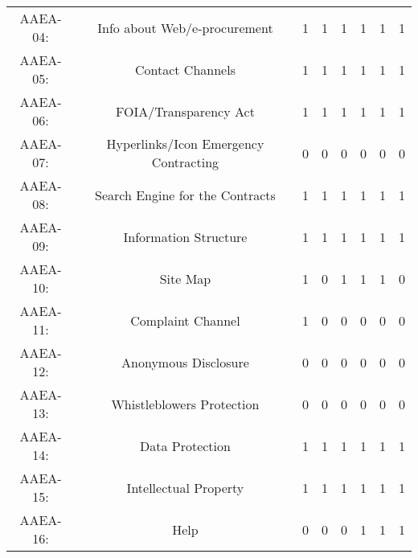 \documentclass[a4paper, twoside]{report}
\begin{document}
\begin{table}[htbp]
\begin{adjustbox}{max width=\linewidth}
\begin{tabular}{rccccccc}
    \multicolumn{1}{c}{AAEA-04:} & \multicolumn{1}{p{19em}}{Info about Web/e-procurement} & 1     & 1     & 1     & 1     & 1     & 1 \\
    \multicolumn{1}{c}{AAEA-05:} & \multicolumn{1}{p{19em}}{Contact Channels} & 1     & 1     & 1     & 1     & 1     & 1 \\
    \multicolumn{1}{c}{AAEA-06:} & \multicolumn{1}{p{19em}}{FOIA/Transparency Act} & 1     & 1     & 1     & 1     & 1     & 1 \\
    \multicolumn{1}{c}{AAEA-07:} & \multicolumn{1}{p{19em}}{\cellcolor[rgb]{ .749,  .749,  .749}Hyperlinks/Icon Emergency Contracting} & \cellcolor[rgb]{ .749,  .749,  .749}0 & \cellcolor[rgb]{ .749,  .749,  .749}0 & \cellcolor[rgb]{ .749,  .749,  .749}0 & \cellcolor[rgb]{ .749,  .749,  .749}0 & \cellcolor[rgb]{ .749,  .749,  .749}0 & \cellcolor[rgb]{ .749,  .749,  .749}0 \\
    \multicolumn{1}{c}{AAEA-08:} & \multicolumn{1}{p{19em}}{Search Engine for the Contracts} & 1     & 1     & 1     & 1     & 1     & 1 \\
    \multicolumn{1}{c}{AAEA-09:} & \multicolumn{1}{p{19em}}{Information Structure} & 1     & 1     & 1     & 1     & 1     & 1 \\
    \multicolumn{1}{c}{AAEA-10:} & \multicolumn{1}{p{19em}}{Site Map} & 1     & 0     & 1     & 1     & 1     & 0 \\
    \multicolumn{1}{c}{AAEA-11:} & \multicolumn{1}{p{19em}}{Complaint Channel} & 1     & 0     & 0     & 0     & 0     & 0 \\
    \multicolumn{1}{c}{AAEA-12:} & \multicolumn{1}{p{19em}}{\cellcolor[rgb]{ .749,  .749,  .749}Anonymous Disclosure} & \cellcolor[rgb]{ .749,  .749,  .749}0 & \cellcolor[rgb]{ .749,  .749,  .749}0 & \cellcolor[rgb]{ .749,  .749,  .749}0 & \cellcolor[rgb]{ .749,  .749,  .749}0 & \cellcolor[rgb]{ .749,  .749,  .749}0 & \cellcolor[rgb]{ .749,  .749,  .749}0 \\
    \multicolumn{1}{c}{AAEA-13:} & \multicolumn{1}{p{19em}}{Whistleblowers Protection} & 0     & 0     & 0     & 0     & 0     & 0 \\
    \multicolumn{1}{c}{AAEA-14:} & \multicolumn{1}{p{19em}}{Data Protection} & 1     & 1     & 1     & 1     & 1     & 1 \\
    \multicolumn{1}{c}{AAEA-15:} & \multicolumn{1}{p{19em}}{Intellectual Property} & 1     & 1     & 1     & 1     & 1     & 1 \\
    \multicolumn{1}{c}{AAEA-16:} & \multicolumn{1}{p{19em}}{Help} & 0     & 0     & 0     & 1     & 1     & 1 \\

\end{tabular}
\end{adjustbox}
\end{table}
\end{document}
